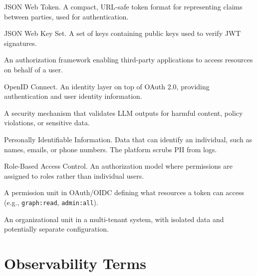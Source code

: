 \begin{description}[style=nextline,leftmargin=2cm,labelwidth=1.8cm]

\item[JWT]
JSON Web Token. A compact, URL-safe token format for representing claims between parties, used for authentication.

\item[JWKS]
JSON Web Key Set. A set of keys containing public keys used to verify JWT signatures.

\item[OAuth 2.0]
An authorization framework enabling third-party applications to access resources on behalf of a user.

\item[OIDC]
OpenID Connect. An identity layer on top of OAuth 2.0, providing authentication and user identity information.

\item[Output Guard]
A security mechanism that validates LLM outputs for harmful content, policy violations, or sensitive data.

\item[PII]
Personally Identifiable Information. Data that can identify an individual, such as names, emails, or phone numbers. The platform scrubs PII from logs.

\item[RBAC]
Role-Based Access Control. An authorization model where permissions are assigned to roles rather than individual users.

\item[Scope]
A permission unit in OAuth/OIDC defining what resources a token can access (e.g., \texttt{graph:read}, \texttt{admin:all}).

\item[Tenant]
An organizational unit in a multi-tenant system, with isolated data and potentially separate configuration.

\end{description}

\section{Observability Terms}
\label{app:glossary:observability}

